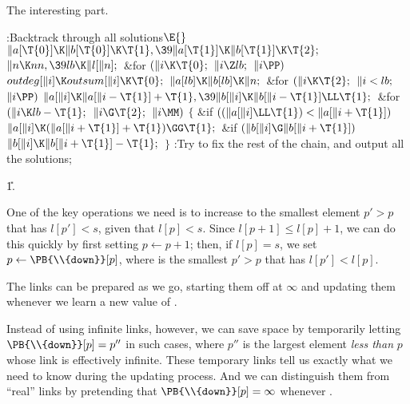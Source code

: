 The interesting part.

\Y\B\4:Backtrack through all solutions\X${}\E{}$\6
$\|a[\T{0}]\K\|b[\T{0}]\K\T{1},\39\|a[\T{1}]\K\|b[\T{1}]\K\T{2};{}$\6
${}\|n\K\\{nn},\39\\{lb}\K\|l[\|n];{}$\6
\&{for} ${}(\|i\K\T{0};{}$ ${}\|i\Z\\{lb};{}$ ${}\|i\PP){}$\1\5
${}\\{outdeg}[\|i]\K\\{outsum}[\|i]\K\T{0};{}$\2\6
${}\|a[\\{lb}]\K\|b[\\{lb}]\K\|n;{}$\6
\&{for} ${}(\|i\K\T{2};{}$ ${}\|i<\\{lb};{}$ ${}\|i\PP){}$\1\5
${}\|a[\|i]\K\|a[\|i-\T{1}]+\T{1},\39\|b[\|i]\K\|b[\|i-\T{1}]\LL\T{1};{}$\2\6
\&{for} ${}(\|i\K\\{lb}-\T{1};{}$ ${}\|i\G\T{2};{}$ ${}\|i\MM){}$\5
${}\{{}$\1\6
\&{if} ${}((\|a[\|i]\LL\T{1})<\|a[\|i+\T{1}]){}$\1\5
${}\|a[\|i]\K(\|a[\|i+\T{1}]+\T{1})\GG\T{1};{}$\2\6
\&{if} ${}(\|b[\|i]\G\|b[\|i+\T{1}]){}$\1\5
${}\|b[\|i]\K\|b[\|i+\T{1}]-\T{1};{}$\2\6
\4${}\}{}$\2\6
:Try to fix the rest of the chain, and output all the solutions\X;\par
\U1.\fi

One of the key operations we need is to increase 
to the smallest
element $p'>p$ that has $l[p']<s$, given that $l[p]<s$. Since
$l[p+1]\le l[p]+1$, we can do this quickly by first setting $p\gets p+1$;
then, if $l[p]=s$, we set $p\gets\PB{\\{down}}[p]$, where  is
the
smallest $p'>p$ that has $l[p']<l[p]$.

The links  can be prepared as we go, starting them off at $%
\infty$
and updating them whenever we learn a new value of .

Instead of using infinite links, however, we can save space by
temporarily letting $\PB{\\{down}}[p]=p''$ in such cases, where $p''$ is the
largest element {\it less than\/} $p$ whose  link is effectively
infinite. These temporary links tell us exactly what we need to know during
the updating process. And we can distinguish them from ``real'' 
links by pretending that $\PB{\\{down}}[p]=\infty$ whenever .


